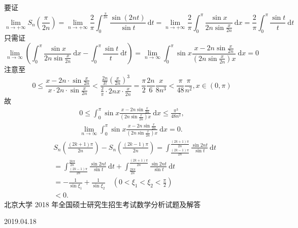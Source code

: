 \documentclass[10pt]{article}
\begin{document}
 要证 
$$
\lim _{n \rightarrow+\infty} S_{n}\left(\frac{\pi}{2 n}\right)=\lim _{n \rightarrow+\infty} \frac{2}{\pi} \int_{0}^{\frac{\pi}{2 n}} \frac{\sin (2 n t)}{\sin t} \mathrm{~d} t=\lim _{n \rightarrow+\infty} \frac{2}{\pi} \int_{0}^{\pi} \frac{\sin x}{2 n \sin \frac{x}{2 n}} \mathrm{~d} x=\frac{2}{\pi} \int_{0}^{\pi} \frac{\sin t}{t} \mathrm{~d} t
$$
 只需证 
$$
\lim _{n \rightarrow \infty}\left(\int_{0}^{\pi} \frac{\sin x}{2 n \sin \frac{x}{2 n}} \mathrm{~d} x-\int_{0}^{\pi} \frac{\sin t}{t} \mathrm{~d} t\right)=\lim _{n \rightarrow \infty} \int_{0}^{\pi} \sin x \frac{x-2 n \sin \frac{x}{2 n}}{\left(2 n \sin \frac{x}{2 n}\right) x} \mathrm{~d} x=0
$$
 注意至 
$$
0 \leqslant \frac{x-2 n \cdot \sin \frac{x}{2 n}}{x \cdot 2 n \cdot \sin \frac{x}{2 n}}<\frac{\frac{2 n}{3 !}\left(\frac{x}{2 n}\right)^{3}}{\frac{2}{\pi} \cdot 2 n x \cdot \frac{x}{2 n}}=\frac{\pi}{2} \frac{2 n}{6} \frac{x}{8 n^{3}}<\frac{\pi}{48} \frac{\pi}{n^{2}}, x \in(0, \pi)
$$
 故 
$$
\begin{gathered}
0 \leqslant \int_{0}^{\pi} \sin x \frac{x-2 n \sin \frac{x}{2 n}}{\left(2 n \sin \frac{x}{2 n}\right) x} \mathrm{~d} x \leqslant \frac{\pi^{3}}{48 n^{2}}, \\
\lim _{n \rightarrow \infty} \int_{0}^{\pi} \sin x \frac{x-2 n \sin \frac{x}{2 n}}{\left(2 n \sin \frac{x}{2 n}\right) x} \mathrm{~d} x=0 .
\end{gathered}
$$
$$
\begin{aligned}
& S_{n}\left(\frac{(2 k+1) \pi}{2 n}\right)-S_{n}\left(\frac{(2 k-1) \pi}{2 n}\right)=\int_{\frac{(2 k-1) \pi}{2 n}}^{\frac{(2 k+1) \pi}{2 n}} \frac{\sin 2 n t}{\sin t} \mathrm{~d} t \\
& =\int_{\frac{(2 k-1) \pi}{2 n}}^{\frac{2 k \pi}{2 n}} \frac{\sin 2 n t}{\sin t} \mathrm{~d} t+\int_{\frac{2 k \pi}{2 n}}^{\frac{(2 k+1) \pi}{2 n}} \frac{\sin 2 n t}{\sin t} \mathrm{~d} t \\
& =-\frac{1}{\sin \xi_{1}}+\frac{1}{\sin \xi_{2}} \quad\left(0<\xi_{1}<\xi_{2}<\frac{\pi}{2}\right) \\
& <0 \text {. } 
\end{aligned}
$$
 北京大学  2018  年全国硕士研究生招生考试数学分析试题及解答     

2019.04.18
\end{document}
